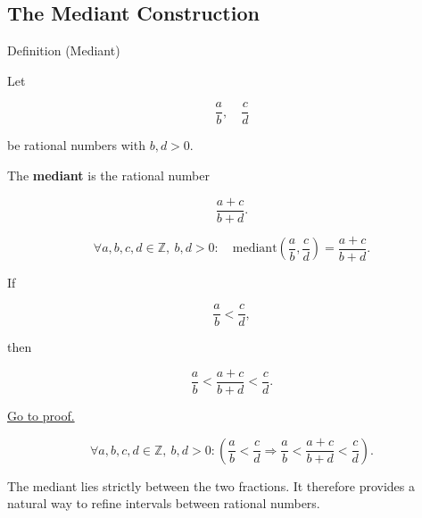 \subsection*{The Mediant Construction}

\begin{definitionbox}{Definition (Mediant)}

Let

\[
\frac{a}{b},\quad \frac{c}{d}
\]

be rational numbers with $b,d>0$.

The \textbf{mediant} is the rational number

\[
\frac{a+c}{b+d}.
\]

\end{definitionbox}

\begin{remark*}

\[
\forall a,b,c,d\in\mathbb{Z},\ b,d>0:
\quad
\text{mediant}\!\left(\frac{a}{b},\frac{c}{d}\right)
=
\frac{a+c}{b+d}.
\]

\end{remark*}

\begin{proposition}
\label{prop:stern-brocot-mediant-inequality}

If

\[
\frac{a}{b} < \frac{c}{d},
\]

then

\[
\frac{a}{b}
<
\frac{a+c}{b+d}
<
\frac{c}{d}.
\]

\hyperref[prf:stern-brocot-mediant-inequality]{Go to proof.}
\end{proposition}

\begin{remark*}

\[
\forall a,b,c,d\in\mathbb{Z},\ b,d>0:
\left(
\frac{a}{b}<\frac{c}{d}
\Rightarrow
\frac{a}{b}
<
\frac{a+c}{b+d}
<
\frac{c}{d}
\right).
\]

\end{remark*}

\begin{remark*}[Intuition]

The mediant lies strictly between the two fractions.
It therefore provides a natural way to refine intervals
between rational numbers.

\end{remark*}

\begin{exposition}
\bigskip
\end{exposition}

